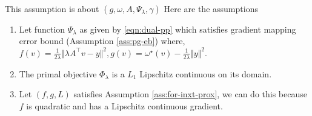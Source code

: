 \documentclass[12pt]{article}
\begin{document}
    \begin{assumption}\;\label{ass:eb-for-pp}\\
        This assumption is about $(g, \omega, A, \Psi_\lambda, \gamma)$
        Here are the assumptions
        \begin{enumerate}[nosep]
            \item Let function $\Psi_\lambda$ as given by \eqref{eqn:dual-pp} which satisfies gradient mapping error bound (Assumption \ref{ass:pg-eb}) where, $f(v) = \frac{1}{2\lambda}\Vert \lambda A^\top v - y\Vert^2, g(v) = \omega^\star(v) - \frac{1}{2\lambda}\Vert y\Vert^2$. 
            \item The primal objective $\Phi_\lambda$ is a $L_1$ Lipschitz continuous on its domain. 
            \item Let $(f, g, L)$ satisfies Assumption \ref{ass:for-inxt-prox}, we can do this because $f$ is quadratic and has a Lipschitz continuous gradient. 
        \end{enumerate}
    \end{assumption}
\end{document}
